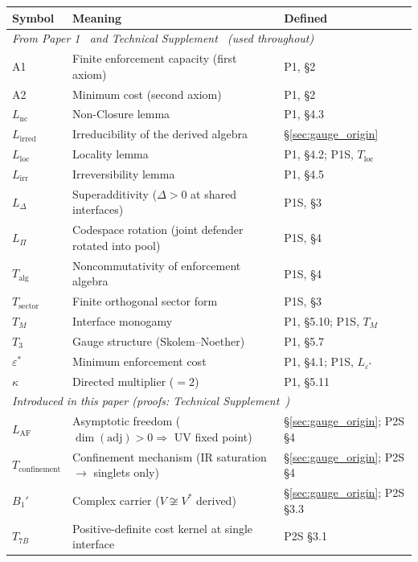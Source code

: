 \documentclass[11pt]{article}
\begin{document}
\begin{center}
\small
\begin{tabular}{lp{8.5cm}l}
\toprule
\textbf{Symbol} & \textbf{Meaning} & \textbf{Defined} \\
\midrule
\multicolumn{3}{l}{\textit{From Paper 1~\cite{BrookePaper1} and Technical Supplement~\cite{BrookeSupplement} (used throughout)}} \\[2pt]
A1 & Finite enforcement capacity (first axiom) & P1, \S2 \\
A2 & Minimum cost (second axiom) & P1, \S2 \\
$L_{\mathrm{nc}}$ & Non-Closure lemma & P1, \S4.3 \\
$L_{\mathrm{irred}}$ & Irreducibility of the derived algebra & \S\ref{sec:gauge_origin} \\
$L_{\mathrm{loc}}$ & Locality lemma & P1, \S4.2; P1S, $T_{\mathrm{loc}}$ \\
$L_{\mathrm{irr}}$ & Irreversibility lemma & P1, \S4.5 \\
$L_\Delta$ & Superadditivity ($\Delta > 0$ at shared interfaces) & P1S, \S3 \\
$L_\Pi$ & Codespace rotation (joint defender rotated into pool) & P1S, \S4 \\
$T_{\mathrm{alg}}$ & Noncommutativity of enforcement algebra & P1S, \S4 \\
$T_{\mathrm{sector}}$ & Finite orthogonal sector form & P1S, \S3 \\
$T_M$ & Interface monogamy & P1, \S5.10; P1S, $T_M$ \\
$T_3$ & Gauge structure (Skolem--Noether) & P1, \S5.7 \\
$\varepsilon^*$ & Minimum enforcement cost & P1, \S4.1; P1S, $L_{\varepsilon^*}$ \\
$\kappa$ & Directed multiplier ($= 2$) & P1, \S5.11 \\[4pt]
\multicolumn{3}{l}{\textit{Introduced in this paper (proofs: Technical Supplement~\cite{BrookeP2Supplement})}} \\[2pt]
$L_{\mathrm{AF}}$ & Asymptotic freedom ($\dim(\mathrm{adj}) > 0 \Rightarrow$ UV fixed point) & \S\ref{sec:gauge_origin}; P2S \S4 \\
$T_{\mathrm{confinement}}$ & Confinement mechanism (IR saturation $\to$ singlets only) & \S\ref{sec:gauge_origin}; P2S \S4 \\
$B_1'$ & Complex carrier ($V \not\cong V^*$ derived) & \S\ref{sec:gauge_origin}; P2S \S3.3 \\
$T_{7B}$ & Positive-definite cost kernel at single interface & P2S \S3.1 \\

\end{tabular}
\end{center}
\end{document}

